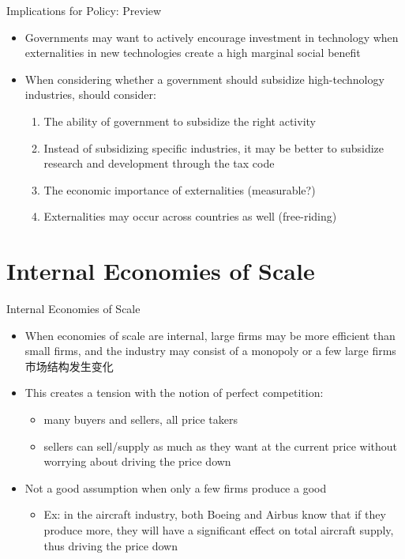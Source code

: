 \documentclass[10pt,hyperref={CJKbookmarks=true},xcolor=dvipsnames,aspectratio=169]{beamer}
\begin{document}
\begin{frame}{Implications for Policy: Preview }

\begin{itemize}
\item Governments may want to actively encourage investment in technology
when externalities in new technologies create a high marginal social
benefit 
\item When considering whether a government should subsidize high-technology
industries, should consider: 

\begin{enumerate}
\item The ability of government to subsidize the right activity 
\item Instead of subsidizing specific industries, it may be better to subsidize
research and development through the tax code 
\item The economic importance of externalities (measurable?) 
\item Externalities may occur across countries as well (free-riding) 
\end{enumerate}
\end{itemize}
\end{frame}



\section{Internal Economies of Scale }
\begin{frame}{Internal Economies of Scale }

\begin{itemize}
\item When economies of scale are internal, large firms may be more efficient
than small firms, and the industry may consist of a monopoly or a
few large firms 市场结构发生变化
\item This creates a tension with the notion of perfect competition: 

\begin{itemize}
\item many buyers and sellers, all price takers 
\item sellers can sell/supply as much as they want at the current price
without worrying about driving the price down 
\end{itemize}
\item Not a good assumption when only a few firms produce a good 

\begin{itemize}
\item Ex: in the aircraft industry, both Boeing and Airbus know that if
they produce more, they will have a significant effect on total aircraft
supply, thus driving the price down 
\end{itemize}
\end{itemize}
\end{frame}
\end{document}
